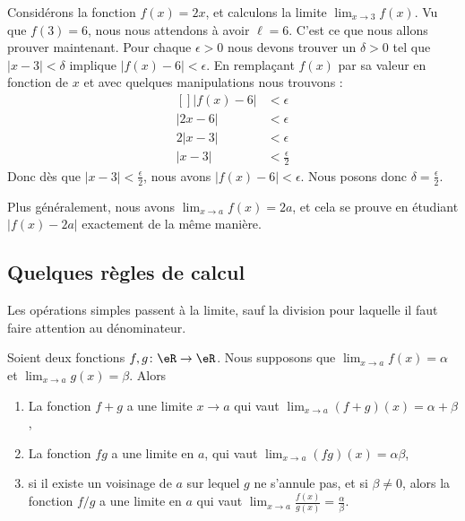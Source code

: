 \begin{example}
	Considérons la fonction \( f(x)=2x\), et calculons la limite \( \lim_{x\to 3} f(x)\). Vu que \( f(3)=6\), nous nous attendons à avoir \( \ell=6\). C'est ce que nous allons prouver maintenant. Pour chaque \( \epsilon>0\) nous devons trouver un \( \delta>0\) tel que \( | x-3 |<\delta\) implique \( | f(x)-6 |<\epsilon\). En remplaçant \( f(x)\) par sa valeur en fonction de \( x\) et avec quelques manipulations nous trouvons :
	\begin{equation}
		\begin{aligned}[]
			| f(x)-6 | & <\epsilon                \\
			| 2x-6 |   & <\epsilon                \\
			2| x-3 |   & <\epsilon                \\
			| x-3 |    & <\frac{ \epsilon }{2}
		\end{aligned}
	\end{equation}
	Donc dès que \( | x-3 |<\frac{ \epsilon }{2}\), nous avons \( | f(x)-6 |<\epsilon\). Nous posons donc \( \delta=\frac{ \epsilon }{2}\).

	Plus généralement, nous avons \( \lim_{x\to a} f(x)=2a\), et cela se prouve en étudiant \( | f(x)-2a |\) exactement de la même manière.
\end{example}

\subsection{Quelques règles de calcul}

Les opérations simples passent à la limite, sauf la division pour laquelle il faut faire attention au dénominateur.
\begin{proposition}     \label{PropOpsSimplesLimites}
    Soient deux fonctions \( f,g\colon \eR\to \eR\). Nous supposons que \( \lim_{x\to a} f(x)=\alpha\) et \( \lim_{x\to a} g(x)=\beta\). Alors
	\begin{enumerate}
        \item   \label{ITEMooOJUWooQpqqnQ}
            La fonction \( f+g\) a une limite \( x\to a\) qui vaut \( \lim_{x\to a} (f+g)(x)=\alpha+\beta\),
		\item
            La fonction \( fg\) a une limite en \( a\), qui vaut \( \lim_{x\to a} (fg)(x)=\alpha\beta\),
		\item
            si il existe un voisinage de \( a\) sur lequel \( g\) ne s'annule pas, et si \( \beta\neq 0\), alors la fonction \( f/g\) a une limite en \( a\) qui vaut \( \lim_{x\to a} \frac{ f(x) }{ g(x) }=\frac{ \alpha }{ \beta }\).
	\end{enumerate}
\end{proposition}

